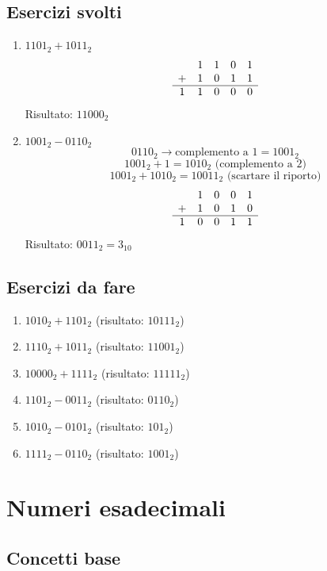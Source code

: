 \documentclass[12pt,a4paper]{article}
\begin{document}
\subsection{Esercizi svolti}
\begin{enumerate}
    \item $1101_2 + 1011_2$
    \[\begin{array}{c c c c c}
     & 1 & 1 & 0 & 1 \\
    + & 1 & 0 & 1 & 1 \\
    \hline
    1 & 1 & 0 & 0 & 0
    \end{array}\]
    Risultato: $11000_2$

    \item $1001_2 - 0110_2$
    \[
    0110_2 \rightarrow \text{complemento a 1} = 1001_2
    \]
    \[
    1001_2 + 1 = 1010_2 \text{ (complemento a 2)}
    \]
    \[
    1001_2 + 1010_2 = 10011_2 \text{ (scartare il riporto)}
    \]
    \[
    \begin{array}{c c c c c}
        & 1 & 0 & 0 & 1 \\
    +   & 1 & 0 & 1 & 0 \\
    \hline
    1 & 0 & 0 & 1 & 1
    \end{array}
    \]
    Risultato: $0011_2 = 3_{10}$
\end{enumerate}

\subsection{Esercizi da fare}
\begin{enumerate}
    \item $1010_2 + 1101_2$ (risultato: $10111_2$)
    \item $1110_2 + 1011_2$ (risultato: $11001_2$)
    \item $10000_2 + 1111_2$ (risultato: $11111_2$)
    \item $1101_2 - 0011_2$ (risultato: $0110_2$)
    \item $1010_2 - 0101_2$ (risultato: $101_2$)
    \item $1111_2 - 0110_2$ (risultato: $1001_2$)
\end{enumerate}

\newpage
\section{Numeri esadecimali}

\subsection{Concetti base}
\end{document}
